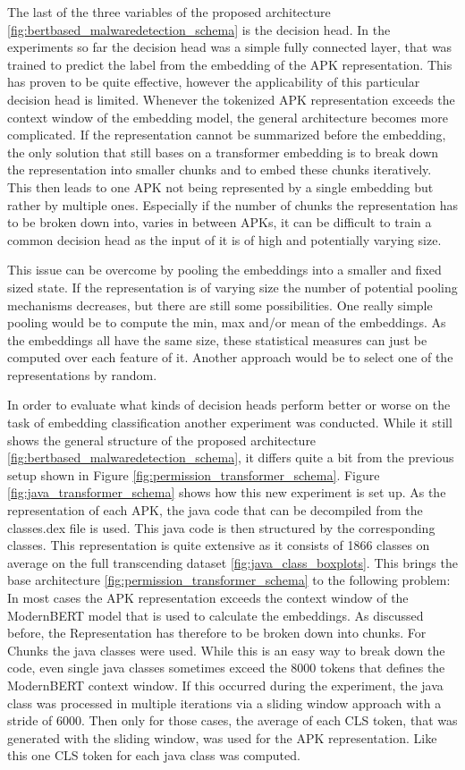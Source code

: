 The last of the three variables of the proposed architecture 
\ref{fig:bertbased_malwaredetection_schema}
is the decision head. 
In the experiments so far the decision head was a simple fully connected layer,
that was trained to predict the label from the embedding of the APK representation.
This has proven to be quite effective, however the applicability of this particular 
decision head is limited.
Whenever the tokenized APK representation exceeds the context window of the embedding 
model, the general architecture becomes more complicated.
If the representation cannot be summarized before the embedding, the only solution 
that still bases on a transformer embedding is to break down the representation into 
smaller chunks and to embed these chunks iteratively.
This then leads to one APK not being represented by a single 
embedding but rather by multiple ones.
Especially if the number of chunks the representation has to be broken down into, 
varies in between APKs, it can be difficult to train a common decision head as the 
input of it is of high and potentially varying size.

This issue can be overcome by pooling the embeddings into a smaller and fixed sized
state.
If the representation is of varying size the number of potential pooling mechanisms decreases,
but there are still some possibilities.
One really simple pooling would be to compute the min, max and/or mean of the embeddings.
As the embeddings all have the same size, these statistical measures can just be computed
over each feature of it.
Another approach would be to select one of the representations by random.

In order to evaluate what kinds of decision heads perform better or worse on 
the task of embedding classification another experiment was conducted.
While it still shows the general structure of the proposed architecture 
\ref{fig:bertbased_malwaredetection_schema}, it differs quite a bit from the 
previous setup shown in Figure \ref{fig:permission_transformer_schema}.
Figure \ref{fig:java_transformer_schema} shows how this new experiment is set up.
As the representation of each APK, the java code that can be decompiled from the
classes.dex file is used. This java code is then structured by the corresponding
classes. This representation is quite extensive as it consists of 1866
classes on average on the full transcending dataset \ref{fig:java_class_boxplots}.
This brings the base architecture \ref{fig:permission_transformer_schema} to
the following problem: In most cases the APK representation exceeds the context
window of the ModernBERT model that is used to calculate the embeddings.
As discussed before, the Representation has therefore to be broken down into chunks.
For Chunks the java classes were used. While this is an easy way to break down the code,
even single java classes sometimes exceed the 8000 tokens that defines the 
ModernBERT context window. If this occurred during the experiment, the java class was
processed in multiple iterations via a sliding window approach with a stride of 6000.
Then only for those cases, the average of each CLS token, that was generated with the
sliding window, was used for the APK representation. 
Like this one CLS token for each java class was computed.

